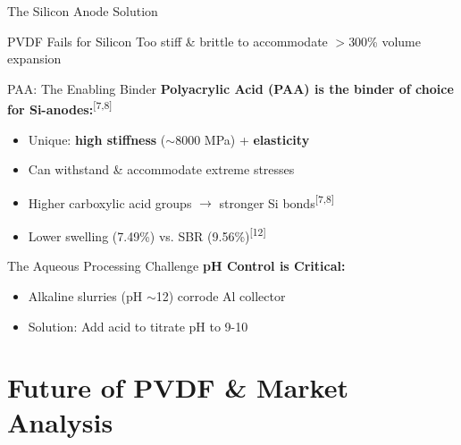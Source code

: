 \documentclass[aspectratio=169]{beamer}
\begin{document}
\begin{frame}{The Silicon Anode Solution}
    \begin{alertblock}{PVDF Fails for Silicon}
        \small Too stiff \& brittle to accommodate $>$300\% volume expansion
    \end{alertblock}
    
    \begin{exampleblock}{PAA: The Enabling Binder}
        \small \textbf{Polyacrylic Acid (PAA) is the binder of choice for Si-anodes:}\textsuperscript{[7,8]}
        \begin{itemize}\small
            \item Unique: \textbf{high stiffness} ($\sim$8000 MPa) + \textbf{elasticity}
            \item Can withstand \& accommodate extreme stresses
            \item Higher carboxylic acid groups $\rightarrow$ stronger Si bonds\textsuperscript{[7,8]}
            \item Lower swelling (7.49\%) vs. SBR (9.56\%)\textsuperscript{[12]}
        \end{itemize}
    \end{exampleblock}
    
    \begin{block}{The Aqueous Processing Challenge}
        \small \textbf{pH Control is Critical:}
        \begin{itemize}\small
            \item Alkaline slurries (pH $\sim$12) corrode Al collector
            \item Solution: Add acid to titrate pH to 9-10
        \end{itemize}
    \end{block}
\end{frame}

\section{Future of PVDF \& Market Analysis}
\end{document}
